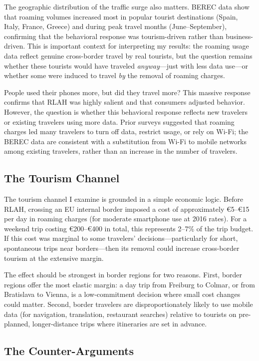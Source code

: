 \documentclass[12pt]{article}
\newcommand{\EUR}[1]{\euro#1}
\begin{document}
The geographic distribution of the traffic surge also matters. BEREC data show that roaming volumes increased most in popular tourist destinations (Spain, Italy, France, Greece) and during peak travel months (June--September), confirming that the behavioral response was tourism-driven rather than business-driven. This is important context for interpreting my results: the roaming usage data reflect genuine cross-border travel by real tourists, but the question remains whether these tourists would have traveled \textit{anyway}---just with less data use---or whether some were induced to travel \textit{by} the removal of roaming charges.

People used their phones more, but did they travel more? This massive response confirms that RLAH was highly salient and that consumers adjusted behavior. However, the question is whether this behavioral response reflects new travelers or existing travelers using more data. Prior surveys suggested that roaming charges led many travelers to turn off data, restrict usage, or rely on Wi-Fi; the BEREC data are consistent with a substitution from Wi-Fi to mobile networks among existing travelers, rather than an increase in the number of travelers.

\subsection{The Tourism Channel}

The tourism channel I examine is grounded in a simple economic logic. Before RLAH, crossing an EU internal border imposed a cost of approximately \EUR{5}--\EUR{15} per day in roaming charges (for moderate smartphone use at 2016 rates). For a weekend trip costing \EUR{200}--\EUR{400} in total, this represents 2--7\% of the trip budget. If this cost was marginal to some travelers' decisions---particularly for short, spontaneous trips near borders---then its removal could increase cross-border tourism at the extensive margin.

The effect should be strongest in border regions for two reasons. First, border regions offer the most elastic margin: a day trip from Freiburg to Colmar, or from Bratislava to Vienna, is a low-commitment decision where small cost changes could matter. Second, border travelers are disproportionately likely to use mobile data (for navigation, translation, restaurant searches) relative to tourists on pre-planned, longer-distance trips where itineraries are set in advance.

\subsection{The Counter-Arguments}
\end{document}
